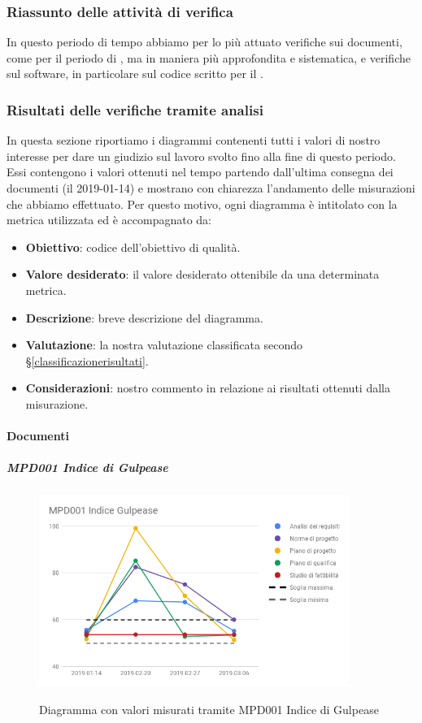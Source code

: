 	\subsubsection{Riassunto delle attività di verifica}
	In questo periodo di tempo abbiamo per lo più attuato verifiche sui documenti, come per il periodo di \RR, ma in maniera più approfondita e  sistematica, e verifiche sul software, in particolare sul codice scritto per il .


	\subsubsection{Risultati delle verifiche tramite analisi}
	In questa sezione riportiamo i diagrammi contenenti tutti i valori di nostro interesse per dare un giudizio sul lavoro svolto fino alla fine di questo periodo.
	Essi contengono i valori ottenuti nel tempo partendo dall'ultima consegna dei documenti (il 2019-01-14) e mostrano con chiarezza l'andamento delle misurazioni che abbiamo effettuato.
	Per questo motivo, ogni diagramma è intitolato con la metrica utilizzata ed è accompagnato da:
	\begin{itemize}
		\item \textbf{Obiettivo}: codice dell'obiettivo di qualità.
		\item \textbf{Valore desiderato}: il valore desiderato ottenibile da una determinata metrica.
		\item \textbf{Descrizione}: breve descrizione del diagramma.
		\item \textbf{Valutazione}: la nostra valutazione classificata secondo \S\ref{classificazionerisultati}.
		\item \textbf{Considerazioni}: nostro commento in relazione ai risultati ottenuti dalla misurazione.
	\end{itemize}


	\paragraph{Documenti}

	\subparagraph{MPD001 Indice di Gulpease}

	\begin{figure}[H]
		\centering
		\includegraphics[width=0.9\textwidth]{img/cruscotti/RP/MPD001.png}
		\label{immaginegulpeaseRP}
		\caption{Diagramma con valori misurati tramite MPD001 Indice di Gulpease}
	\end{figure}

